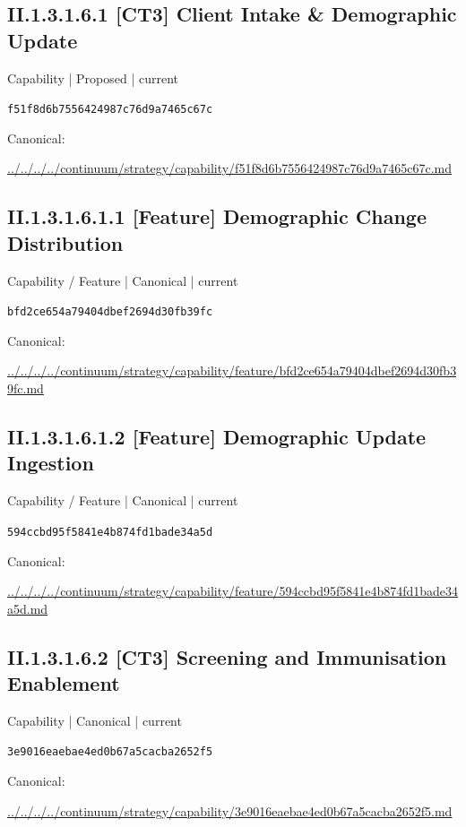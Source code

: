 \documentclass[10pt,a4paper]{article}
\begin{document}
\subsection*{II.1.3.1.6.1 [CT3] Client Intake \& Demographic Update}
\label{element-f51f8d6b7556424987c76d9a7465c67c}
{\small Capability | Proposed | current}\par
\texttt{f51f8d6b7556424987c76d9a7465c67c}\par
Canonical: \par
{\footnotesize\url{../../../../continuum/strategy/capability/f51f8d6b7556424987c76d9a7465c67c.md}}\par
\subsection*{II.1.3.1.6.1.1 [Feature] Demographic Change Distribution}
\label{element-bfd2ce654a79404dbef2694d30fb39fc}
{\small Capability / Feature | Canonical | current}\par
\texttt{bfd2ce654a79404dbef2694d30fb39fc}\par
Canonical: \par
{\footnotesize\url{../../../../continuum/strategy/capability/feature/bfd2ce654a79404dbef2694d30fb39fc.md}}\par
\subsection*{II.1.3.1.6.1.2 [Feature] Demographic Update Ingestion}
\label{element-594ccbd95f5841e4b874fd1bade34a5d}
{\small Capability / Feature | Canonical | current}\par
\texttt{594ccbd95f5841e4b874fd1bade34a5d}\par
Canonical: \par
{\footnotesize\url{../../../../continuum/strategy/capability/feature/594ccbd95f5841e4b874fd1bade34a5d.md}}\par
\subsection*{II.1.3.1.6.2 [CT3] Screening and Immunisation Enablement}
\label{element-3e9016eaebae4ed0b67a5cacba2652f5}
{\small Capability | Canonical | current}\par
\texttt{3e9016eaebae4ed0b67a5cacba2652f5}\par
Canonical: \par
{\footnotesize\url{../../../../continuum/strategy/capability/3e9016eaebae4ed0b67a5cacba2652f5.md}}\par
\end{document}
